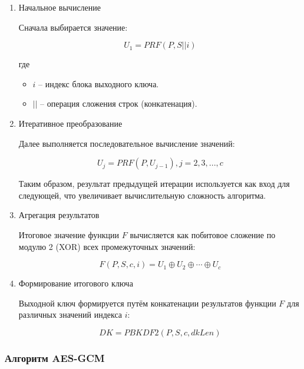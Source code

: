 \documentclass[14pt, a4paper]{extarticle}
\begin{document}
	\begin{enumerate}
	
	\item Начальное вычисление
	
	Сначала выбирается значение:
	
	\begin{equation}
		U_{1} = PRF(P,S||i)
	\end{equation}
	
	где 
	
	\begin{itemize}
	\item $i$ -- индекс блока выходного ключа.
	\item $||$ -- операция сложения строк (конкатенация).
	\end{itemize}
	
	\item Итеративное преобразование
	
	Далее выполняется последовательное вычисление значений:
	
	\begin{equation}
		U_{j} = PRF(P,U_{j-1}), j = 2,3,...,c
	\end{equation}
	
	Таким образом, результат предыдущей итерации используется как вход для следующей, что увеличивает вычислительную сложность алгоритма.
	
	\item Агрегация результатов
	
	Итоговое значение функции $F$ вычисляется как побитовое сложение по модулю 2 (XOR) всех промежуточных значений:
	
	\begin{equation}
		F(P,S,c,i) = U_1 \oplus U_2 \oplus \cdots \oplus U_c
	\end{equation}
	
	\item Формирование итогового ключа
	
	Выходной ключ формируется путём конкатенации результатов функции $F$ для различных значений индекса $i$:
	
	\begin{equation}
		DK = PBKDF2(P,S,c,dkLen)
	\end{equation}
	
	\end{enumerate}
	
	\subsubsection{Алгоритм AES-GCM}
	
\end{document}
